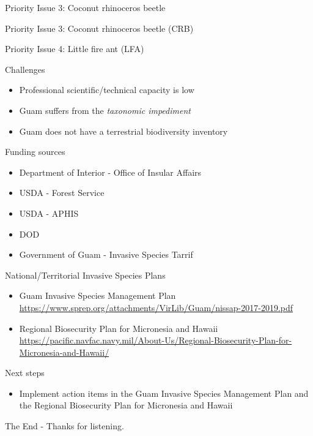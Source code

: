 \documentclass[]{beamer}
\begin{document}
\begin{frame}{Priority Issue 3: Coconut rhinoceros beetle}
\end{frame}

\begin{frame}{Priority Issue 3: Coconut rhinoceros beetle (CRB)}
\end{frame}

\begin{frame}{Priority Issue 4: Little fire ant (LFA)}
\end{frame}

\begin{frame}{Challenges}
	\begin{itemize}
		\item Professional scientific/technical capacity is low
		\item Guam suffers from the \textit{taxonomic impediment}
		\item Guam does not have a terrestrial biodiversity inventory
	\end{itemize}
\end{frame}

\begin{frame}{Funding sources}
	\begin{itemize}
	   \item Department of Interior - Office of Insular Affairs
	   \item USDA - Forest Service
	   \item USDA - APHIS
	   \item DOD
	   \item Government of Guam - Invasive Species Tarrif
	\end{itemize}		
\end{frame}

\begin{frame}{National/Territorial Invasive Species Plans}
	\begin{itemize}
		\item Guam Invasive Species Management Plan \url{https://www.sprep.org/attachments/VirLib/Guam/nissap-2017-2019.pdf}
		\item Regional Biosecurity Plan for Micronesia and Hawaii
		\url{https://pacific.navfac.navy.mil/About-Us/Regional-Biosecurity-Plan-for-Micronesia-and-Hawaii/}
	\end{itemize}	
\end{frame}

\begin{frame}{Next steps}
	\begin{itemize}
		\item Implement action items in the Guam Invasive Species Management Plan and the Regional Biosecurity Plan for Micronesia and Hawaii
	\end{itemize}
\end{frame}

\begin{frame}{The End - Thanks for listening.}
\end{frame}
\end{document}
